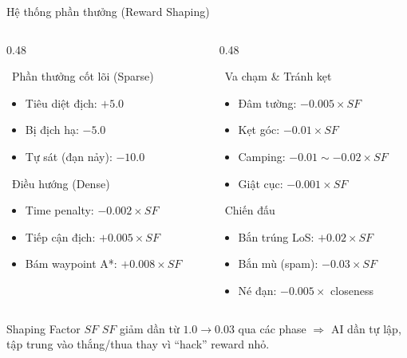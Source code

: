 \documentclass[aspectratio=169, 11pt]{beamer}
\begin{document}
\begin{frame}{Hệ thống phần thưởng (Reward Shaping)}
  \small
  \begin{columns}[T]
    \begin{column}{0.48\textwidth}
      \begin{block}{\faAward~Phần thưởng cốt lõi (Sparse)}
        \begin{itemize}
          \item Tiêu diệt địch: $\mathbf{+5.0}$
          \item Bị địch hạ: $\mathbf{-5.0}$
          \item Tự sát (đạn nảy): $\mathbf{-10.0}$
        \end{itemize}
      \end{block}
      \vspace{4pt}
      \begin{block}{\faRoute~Điều hướng (Dense)}
        \begin{itemize}
          \item Time penalty: $-0.002 \times SF$
          \item Tiếp cận địch: $+0.005 \times SF$
          \item Bám waypoint A*: $+0.008 \times SF$
        \end{itemize}
      \end{block}
    \end{column}
    \begin{column}{0.48\textwidth}
      \begin{block}{\faShieldAlt~Va chạm \& Tránh kẹt}
        \begin{itemize}
          \item Đâm tường: $-0.005 \times SF$
          \item Kẹt góc: $-0.01 \times SF$
          \item Camping: $-0.01 \sim -0.02 \times SF$
          \item Giật cục: $-0.001 \times SF$
        \end{itemize}
      \end{block}
      \vspace{4pt}
      \begin{block}{\faCrosshairs~Chiến đấu}
        \begin{itemize}
          \item Bắn trúng LoS: $+0.02 \times SF$
          \item Bắn mù (spam): $-0.03 \times SF$
          \item Né đạn: $-0.005 \times$ closeness
        \end{itemize}
      \end{block}
    \end{column}
  \end{columns}

  \vspace{6pt}
  \begin{exampleblock}{Shaping Factor $SF$}
    $SF$ giảm dần từ $1.0 \to 0.03$ qua các phase $\Rightarrow$ AI dần tự lập, tập trung vào thắng/thua thay vì ``hack'' reward nhỏ.
  \end{exampleblock}
\end{frame}
\end{document}
